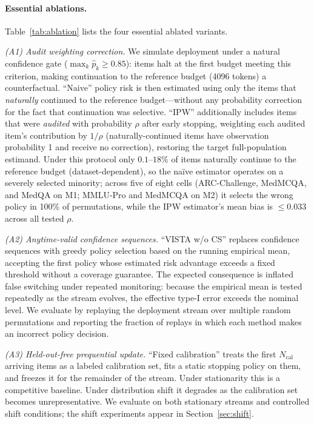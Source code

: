 \documentclass[a4paper,fleqn]{cas-sc}
\theoremstyle{plain}
\theoremstyle{definition}
\theoremstyle{remark}
\begin{document}
\paragraph{Essential ablations.}
Table~\ref{tab:ablation} lists the four essential ablated variants.

\emph{(A1) Audit weighting correction.}
We simulate deployment under a natural confidence gate ($\max_k\hat p_k\geq 0.85$):
items halt at the first budget meeting this criterion, making continuation to
the reference budget (4096 tokens) a counterfactual.
``Naive'' policy risk is then estimated using only the items that
\emph{naturally} continued to the reference budget---without any
probability correction for the fact that continuation was selective.
``IPW'' additionally includes items that were \emph{audited} with probability
$\rho$ after early stopping, weighting each audited item's contribution by
$1/\rho$ (naturally-continued items have observation probability 1 and receive
no correction), restoring the target full-population estimand.
Under this protocol only $0.1$--$18\%$ of items naturally continue to the
reference budget (dataset-dependent), so the na\"{i}ve estimator operates on a
severely selected minority; across five of eight cells (ARC-Challenge,
MedMCQA, and MedQA on M1; MMLU-Pro and MedMCQA on M2)
it selects the wrong policy in 100\% of permutations,
while the IPW estimator's mean bias is $\leq 0.033$ across all tested $\rho$.

\emph{(A2) Anytime-valid confidence sequences.}
``VISTA w/o CS'' replaces confidence sequences with greedy policy selection
based on the running empirical mean, accepting the first policy whose estimated
risk advantage exceeds a fixed threshold without a coverage guarantee.
The expected consequence is inflated false switching under repeated
monitoring: because the empirical mean is tested repeatedly as the stream
evolves, the effective type-I error exceeds the nominal level.
We evaluate by replaying the deployment stream over multiple random
permutations and reporting the fraction of replays in which each method makes
an incorrect policy decision.

\emph{(A3) Held-out-free prequential update.}
``Fixed calibration'' treats the first $N_\text{cal}$ arriving items as a
labeled calibration set, fits a static stopping policy on them, and freezes
it for the remainder of the stream.
Under stationarity this is a competitive baseline.
Under distribution shift it degrades as the calibration set becomes
unrepresentative.
We evaluate on both stationary streams and controlled shift conditions; the
shift experiments appear in Section~\ref{sec:shift}.
\end{document}
